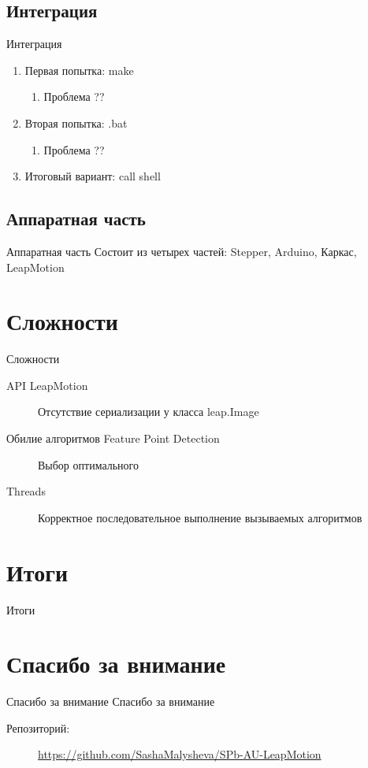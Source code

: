 \documentclass{beamer}
\newcommand{\cimg}[2]{%
	\begin{center}%
		\ifthenelse{\equal{#2}{}}{%
			\texttt{[image: \#1]}
		}{%
			\texttt{[image: \#1]}
		}%
	\end{center}%
}
\begin{document}
\subsection{Интеграция}
\begin{frame}[t]{Интеграция}
	\begin{enumerate}
		\item
		Первая попытка: make
		\begin{enumerate}
			\item Проблема ??
		\end{enumerate}

	\item
		Вторая попытка: .bat
		\begin{enumerate}
			\item Проблема ??
		\end{enumerate}

	\item
		Итоговый вариант: call shell
	\end{enumerate}
\end{frame}

\subsection{Аппаратная часть}
\begin{frame}[t]{Аппаратная часть}
		Состоит из четырех частей: Stepper, Arduino, Каркас, LeapMotion
		\cimg{03.png}{0.6}
\end{frame}

\section{Сложности}
\begin{frame}[t]{Сложности}
	\begin{description}
		\item[API LeapMotion]
			Отсутствие сериализации у класса leap.Image

		\item[Обилие алгоритмов Feature Point Detection]
			Выбор оптимального
			
		\item[Threads]
			Корректное последовательное выполнение вызываемых алгоритмов
	\end{description}
\end{frame}

\section{Итоги}
\begin{frame}[t]{Итоги}
	\cimg{04.png}{0.9}
\end{frame}

\section{Спасибо за внимание}
\begin{frame}[t]{Спасибо за внимание}
	Спасибо за внимание
	\begin{description}
		\item[Репозиторий:]	\url{https://github.com/SashaMalysheva/SPb-AU-LeapMotion}
	\end{description}
\end{frame}
\end{document}
